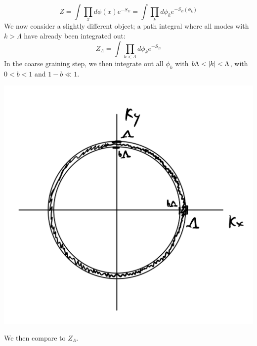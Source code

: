 \begin{equation}
    Z = \int \prod_x d\phi(x)e^{-S_E} = \int \prod_k d\phi_k e^{-S_E(\phi_k)}
\end{equation}
We now consider a slightly different object; a path integral where all modes with $k > \Lambda$ have already been integrated out:
\begin{equation}
    Z_\Lambda = \int \prod_{k < \Lambda}d\phi_k e^{-S_E}
\end{equation}
In the coarse graining step, we then integrate out all $\phi_k$ with $b\Lambda < \lvert k \rvert < \Lambda$, with $0 < b < 1$ and $1 - b \ll 1$.

\begin{center}
    \includegraphics[scale=0.35]{Lectures/Figures/lec14-momentumshell.png}
\end{center}
We then compare to $Z_{\Lambda}$.

